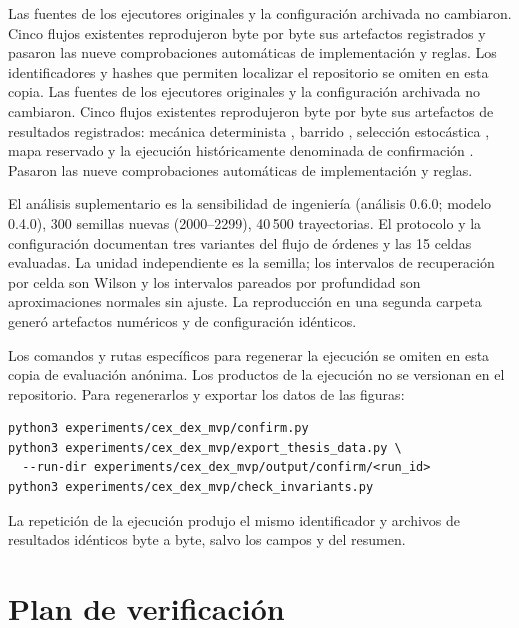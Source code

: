 \ifdefined\blindreviewmode
Las fuentes de los ejecutores originales y la configuración archivada no cambiaron. Cinco flujos existentes reprodujeron byte por byte sus artefactos registrados y pasaron las nueve comprobaciones automáticas de implementación y reglas. Los identificadores y hashes que permiten localizar el repositorio se omiten en esta copia.
\else
Las fuentes de los ejecutores originales y la configuración archivada no cambiaron. Cinco flujos existentes reprodujeron byte por byte sus artefactos de resultados registrados: mecánica determinista , barrido , selección estocástica , mapa reservado  y la ejecución históricamente denominada de confirmación . Pasaron las nueve comprobaciones automáticas de implementación y reglas.
\fi

El análisis suplementario es la sensibilidad de ingeniería (análisis 0.6.0; modelo 0.4.0), 300 semillas nuevas (2000--2299), 40\,500 trayectorias. El protocolo y la configuración documentan tres variantes del flujo de órdenes y las 15 celdas evaluadas. La unidad independiente es la semilla; los intervalos de recuperación por celda son Wilson y los intervalos pareados por profundidad son aproximaciones normales sin ajuste. La reproducción en una segunda carpeta generó artefactos numéricos y de configuración idénticos.

\ifdefined\blindreviewmode
Los comandos y rutas específicos para regenerar la ejecución se omiten en esta copia de evaluación anónima.
\else
Los productos de la ejecución no se versionan en el repositorio. Para regenerarlos y exportar los datos de las figuras:

\begin{verbatim}
python3 experiments/cex_dex_mvp/confirm.py
python3 experiments/cex_dex_mvp/export_thesis_data.py \
  --run-dir experiments/cex_dex_mvp/output/confirm/<run_id>
python3 experiments/cex_dex_mvp/check_invariants.py
\end{verbatim}
\fi

La repetición de la ejecución produjo el mismo identificador y archivos de resultados idénticos byte a byte, salvo los campos  y  del resumen.

\section{Plan de verificación}
\label{sec:verificacion}

